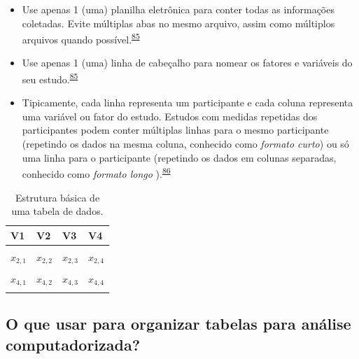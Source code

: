 \documentclass[
  a4paper,
]{book}
\begin{document}
\begin{itemize}
\item
  Use apenas 1 (uma) planilha eletrônica para conter todas as informações coletadas. Evite múltiplas abas no mesmo arquivo, assim como múltiplos arquivos quando possível.\textsuperscript{\protect\hyperlink{ref-broman2018}{85}}
\item
  Use apenas 1 (uma) linha de cabeçalho para nomear os fatores e variáveis do seu estudo.\textsuperscript{\protect\hyperlink{ref-broman2018}{85}}
\item
  Tipicamente, cada linha representa um participante e cada coluna representa uma variável ou fator do estudo. Estudos com medidas repetidas dos participantes podem conter múltiplas linhas para o mesmo participante (repetindo os dados na mesma coluna, conhecido como \emph{formato curto}) ou só uma linha para o participante (repetindo os dados em colunas separadas, conhecido como \emph{formato longo} ).\textsuperscript{\protect\hyperlink{ref-Juluru2015}{86}}
\end{itemize}

\begin{table}

\caption{\label{tab:tabela-0}Estrutura básica de uma tabela de dados.}
\centering
\begin{tabu} to 
\toprule
\textbf{V1} & \textbf{V2} & \textbf{V3} & \textbf{V4}\\
\midrule
{} &  &  & \\
$x_{2,1}$ & $x_{2,2}$ & $x_{2,3}$ & $x_{2,4}$\\
 &  &  & \\
$x_{4,1}$ & $x_{4,2}$ & $x_{4,3}$ & $x_{4,4}$\\
 &  &  & \\
\bottomrule
\end{tabu}
\end{table}

\hypertarget{o-que-usar-para-organizar-tabelas-para-anuxe1lise-computadorizada}{%
\subsection{O que usar para organizar tabelas para análise computadorizada?}\label{o-que-usar-para-organizar-tabelas-para-anuxe1lise-computadorizada}}
\end{document}
